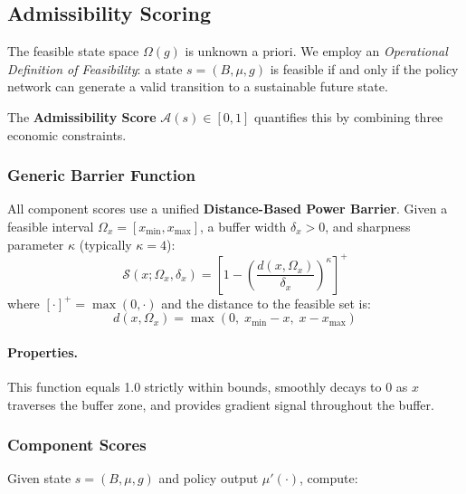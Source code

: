\subsection{Admissibility Scoring}

The feasible state space $\Omega(g)$ is unknown a priori. We employ an \textit{Operational Definition of Feasibility}: a state $s = (B, \mu, g)$ is feasible if and only if the policy network can generate a valid transition to a sustainable future state. 

The \textbf{Admissibility Score} $\mathcal{A}(s) \in [0, 1]$ quantifies this by combining three economic constraints.

\subsubsection{Generic Barrier Function}
All component scores use a unified \textbf{Distance-Based Power Barrier}. Given a feasible interval $\Omega_x = [x_{\min}, x_{\max}]$, a buffer width $\delta_x > 0$, and sharpness parameter $\kappa$ (typically $\kappa = 4$):
\begin{equation}\label{eq:barrier}
    \mathcal{S}(x; \Omega_x, \delta_x) = \left[ 1 - \left( \frac{d(x, \Omega_x)}{\delta_x} \right)^\kappa \right]^+
\end{equation}
where $[\cdot]^+ = \max(0, \cdot)$ and the distance to the feasible set is:
\begin{equation}
    d(x, \Omega_x) = \max\left(0,\; x_{\min} - x,\; x - x_{\max}\right)
\end{equation}

\paragraph{Properties.} This function equals 1.0 strictly within bounds, smoothly decays to 0 as $x$ traverses the buffer zone, and provides gradient signal throughout the buffer.

\subsubsection{Component Scores}
Given state $s = (B, \mu, g)$ and policy output $\mu'(\cdot)$, compute:

